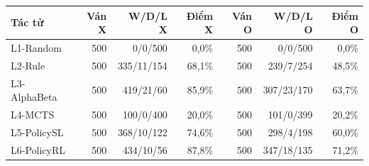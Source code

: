 \begin{center}\small
\begin{tabular}{@{}lrrrrrr@{}}
\toprule
Tác tử & Ván X & W/D/L X & Điểm X & Ván O & W/D/L O & Điểm O \\
\midrule
L1-Random & 500 & 0/0/500 & 0,0\% & 500 & 0/0/500 & 0,0\% \\
L2-Rule & 500 & 335/11/154 & 68,1\% & 500 & 239/7/254 & 48,5\% \\
L3-AlphaBeta & 500 & 419/21/60 & 85,9\% & 500 & 307/23/170 & 63,7\% \\
L4-MCTS & 500 & 100/0/400 & 20,0\% & 500 & 101/0/399 & 20,2\% \\
L5-PolicySL & 500 & 368/10/122 & 74,6\% & 500 & 298/4/198 & 60,0\% \\
L6-PolicyRL & 500 & 434/10/56 & 87,8\% & 500 & 347/18/135 & 71,2\% \\
\bottomrule
\end{tabular}
\end{center}